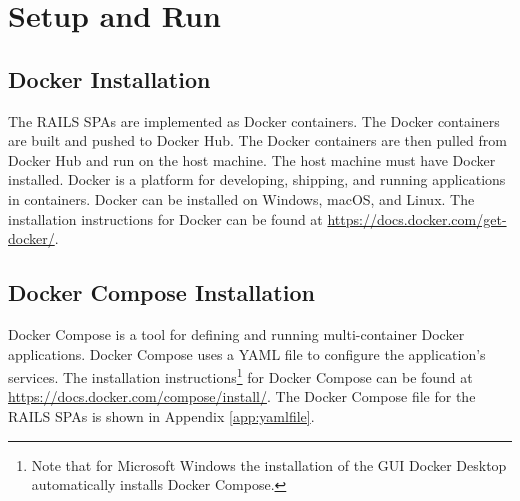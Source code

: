 \chapter{Setup and Run}
\label{ch:installandrun}
\section{Docker Installation}
\label{sec:dockerinstall}
The \ac{RAILS} \acp{SPA} are implemented as Docker containers. The Docker containers are built and pushed to Docker Hub. The Docker containers are then pulled from Docker Hub and run on the host machine. 
The host machine must have Docker installed. Docker is a platform for developing, shipping, and running applications in containers. Docker can be installed on Windows, macOS, and Linux. 
The installation instructions for Docker can be found at \href{https://docs.docker.com/get-docker/}{https://docs.docker.com/get-docker/}.
\section{Docker Compose Installation}
\label{sec:dockercomposeinstall}
Docker Compose is a tool for defining and running multi-container Docker applications. Docker Compose uses a YAML file to configure the application's services. The installation instructions\footnote{Note that for Microsoft Windows the installation of the \ac{GUI} Docker Desktop automatically installs Docker Compose.} for Docker Compose can be found at \href{https://docs.docker.com/compose/install/}{https://docs.docker.com/compose/install/}.  The Docker Compose file for the \ac{RAILS} \acp{SPA} is shown in Appendix \ref{app:yamlfile}.
